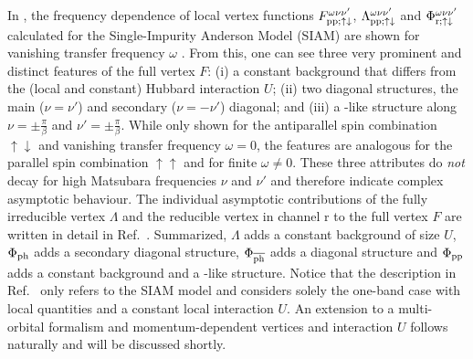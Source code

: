 \documentclass[\main/main.tex]{subfiles}
\begin{document}
In , the frequency dependence of local vertex functions $F^{\omega\nu\nu'}_{\text{pp};\uparrow\downarrow}$, $\Lambda^{\omega\nu\nu'}_{\text{pp};\uparrow\downarrow}$ and $\Phi^{\omega\nu\nu'}_{\text{r};\uparrow\downarrow}$ calculated for the Single-Impurity Anderson Model (SIAM) are shown for vanishing transfer frequency $\omega$ \cite{Wentzell2020}. From this, one can see three very prominent and distinct features of the full vertex $F$: (i) a constant background that differs from the (local and constant) Hubbard interaction $U$; (ii) two diagonal structures, the main ($\nu=\nu'$) and secondary ($\nu=-\nu'$) diagonal; and (iii) a -like structure along $\nu=\pm\frac\pi\beta$ and $\nu'=\pm\frac\pi\beta$. While only shown for the antiparallel spin combination $\uparrow\downarrow$ and vanishing transfer frequency $\omega=0$, the features are analogous for the parallel spin combination $\uparrow\uparrow$ and for finite $\omega\neq0$. These three attributes do \textit{not} decay for high Matsubara frequencies $\nu$ and $\nu'$ and therefore indicate complex asymptotic behaviour. The individual asymptotic contributions of the fully irreducible vertex $\Lambda$ and the reducible vertex in channel r to the full vertex $F$ are written in detail in Ref.~\cite{Wentzell2020}. Summarized, $\Lambda$ adds a constant background of size $U$, $\Phi_{\text{ph}}$ adds a secondary diagonal structure, $\Phi_{\overline{\text{ph}}}$ adds a diagonal structure and $\Phi_{\text{pp}}$ adds a constant background and a -like structure. Notice that the description in Ref.~\cite{Wentzell2020} only refers to the SIAM model and considers solely the one-band case with local quantities and a constant local interaction $U$. An extension to a multi-orbital formalism and momentum-dependent vertices and interaction $U$ follows naturally and will be discussed shortly.
\end{document}
